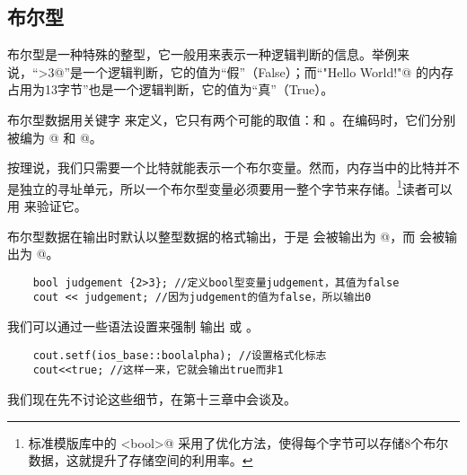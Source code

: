 \subsection*{布尔型}
布尔型是一种特殊的整型，它一般用来表示一种逻辑判断的信息。举例来说，``>3@''是一个逻辑判断，它的值为``假''（False）；而``\lstinline@"Hello World!"@ 的内存占用为13字节''也是一个逻辑判断，它的值为``真''（True）。\par
布尔型数据用关键字 \lstinline@bool@ 来定义，它只有两个可能的取值：\lstinline@true@ 和 \lstinline@false@。在编码时，它们分别被编为 @ 和 @。\par
按理说，我们只需要一个比特就能表示一个布尔变量。然而，内存当中的比特并不是独立的寻址单元，所以一个布尔型变量必须要用一整个字节来存储。\footnote{标准模版库中的 \lstinline@vector<bool>@ 采用了优化方法，使得每个字节可以存储8个布尔数据，这就提升了存储空间的利用率。}读者可以用 \lstinline@sizeof@ 来验证它。\par
布尔型数据在输出时默认以整型数据的格式输出，于是 \lstinline@false@ 会被输出为 @，而 \lstinline@true@ 会被输出为 @。
\begin{lstlisting}
    bool judgement {2>3}; //定义bool型变量judgement，其值为false
    cout << judgement; //因为judgement的值为false，所以输出0
\end{lstlisting}
我们可以通过一些语法设置来强制 \lstinline@cout@ 输出 \lstinline@true@ 或 \lstinline@false@。
\begin{lstlisting}
    cout.setf(ios_base::boolalpha); //设置格式化标志
    cout<<true; //这样一来，它就会输出true而非1
\end{lstlisting}
我们现在先不讨论这些细节，在第十三章中会谈及。\par
